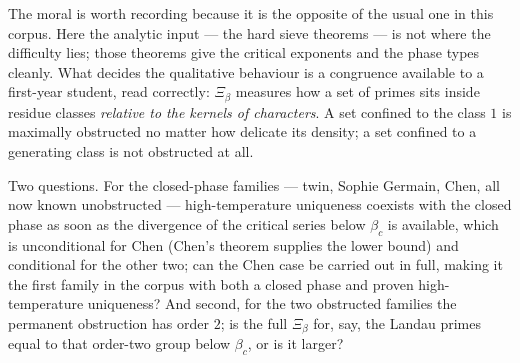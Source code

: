 The moral is worth recording because it is the opposite of the usual one in this corpus. Here
the analytic input --- the hard sieve theorems --- is not where the difficulty lies; those
theorems give the critical exponents and the phase types cleanly. What decides the
qualitative behaviour is a congruence available to a first-year student, read correctly:
$\Xi_\beta$ measures how a set of primes sits inside residue classes \emph{relative to the
kernels of characters}. A set confined to the class $1$ is maximally obstructed no matter
how delicate its density; a set confined to a generating class is not obstructed at all.

Two questions. For the closed-phase families --- twin, Sophie Germain, Chen, all now known
unobstructed --- high-temperature uniqueness coexists with the closed phase as soon as the
divergence of the critical series below $\beta_c$ is available, which is unconditional for
Chen (Chen's theorem \cite{Chen} supplies the lower bound) and conditional for the other
two; can the Chen case be carried out in full, making it the first family in the corpus with
both a closed phase and proven high-temperature uniqueness? And second, for the two
obstructed families the permanent obstruction has order $2$; is the full $\Xi_\beta$ for,
say, the Landau primes equal to that order-two group below $\beta_c$, or is it larger?

